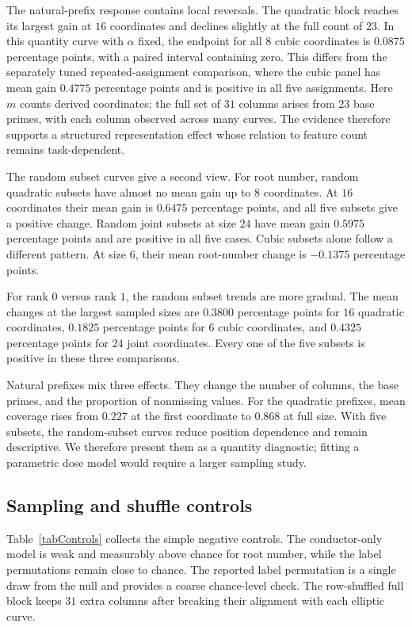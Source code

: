 \documentclass[12pt,reqno]{amsart}
\numberwithin{equation}{section}
\theoremstyle{plain}
\theoremstyle{definition}
\theoremstyle{remark}
\begin{document}
The natural-prefix response contains local reversals.
The quadratic block reaches its largest gain at $16$ coordinates and declines slightly at the full count of $23$.
In this quantity curve with $\alpha$ fixed, the endpoint for all $8$ cubic coordinates is $0.0875$ percentage points, with a paired interval containing zero.
This differs from the separately tuned repeated-assignment comparison, where the cubic panel has mean gain $0.4775$ percentage points and is positive in all five assignments.
Here $m$ counts derived coordinates: the full set of $31$ columns arises from $23$ base primes, with each column observed across many curves.
The evidence therefore supports a structured representation effect whose relation to feature count remains task-dependent.

The random subset curves give a second view.
For root number, random quadratic subsets have almost no mean gain up to $8$ coordinates.
At $16$ coordinates their mean gain is $0.6475$ percentage points, and all five subsets give a positive change.
Random joint subsets at size $24$ have mean gain $0.5975$ percentage points and are positive in all five cases.
Cubic subsets alone follow a different pattern.
At size $6$, their mean root-number change is $-0.1375$ percentage points.

For rank $0$ versus rank $1$, the random subset trends are more gradual.
The mean changes at the largest sampled sizes are $0.3800$ percentage points for $16$ quadratic coordinates, $0.1825$ percentage points for $6$ cubic coordinates, and $0.4325$ percentage points for $24$ joint coordinates.
Every one of the five subsets is positive in these three comparisons.

Natural prefixes mix three effects.
They change the number of columns, the base primes, and the proportion of nonmissing values.
For the quadratic prefixes, mean coverage rises from $0.227$ at the first coordinate to $0.868$ at full size.
With five subsets, the random-subset curves reduce position dependence and remain descriptive.
We therefore present them as a quantity diagnostic; fitting a parametric dose model would require a larger sampling study.

\FloatBarrier

\subsection{Sampling and shuffle controls}

Table~\ref{tabControls} collects the simple negative controls.
The conductor-only model is weak and measurably above chance for root number, while the label permutations remain close to chance.
The reported label permutation is a single draw from the null and provides a coarse chance-level check.
The row-shuffled full block keeps $31$ extra columns after breaking their alignment with each elliptic curve.
\end{document}
